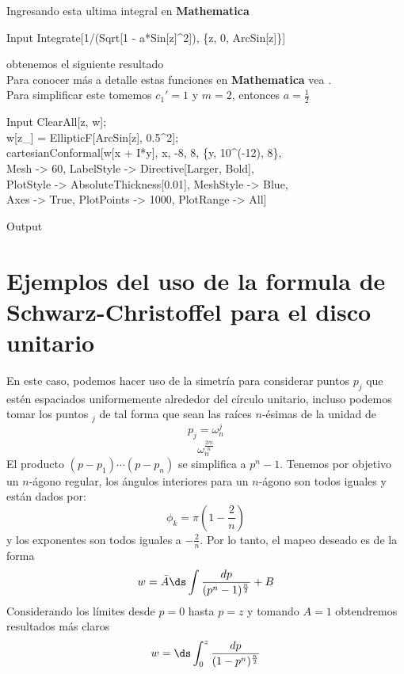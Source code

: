 Ingresando esta ultima integral en \textbf{Mathematica}
\begin{mmaCell}{Input}
  Integrate[1/(Sqrt[1 - a*Sin[z]^2]), \{z, 0, ArcSin[z]\}]
\end{mmaCell}
obtenemos el siguiente resultado\\
Para conocer más a detalle estas funciones en \textbf{Mathematica} vea \cite{Elliptic}.\\
Para simplificar este tomemos $c_1'=1$ y $m=2$, entonces $a=\frac{1}{2}$
\begin{mmaCell}{Input}
	 ClearAll[z, w];\\w[z_] = EllipticF[ArcSin[z], 0.5^2];\\cartesianConformal[w[x + I*y], {x, -8, 8}, \{y, 10^(-12), 8\},\\Mesh -> 60, LabelStyle -> Directive[Larger, Bold],\\PlotStyle -> AbsoluteThickness[0.01], MeshStyle -> Blue,\\Axes -> True, PlotPoints -> 1000, PlotRange -> All]
\end{mmaCell}
\begin{mmaCell}[moregraphics={moreig={scale=0.8}}]{Output}
\end{mmaCell}
\section{Ejemplos del uso de la formula de Schwarz-Christoffel para el disco unitario}
En este caso, podemos hacer uso de la simetría para considerar puntos $p_j$ que estén espaciados uniformemente alrededor del círculo unitario, incluso podemos tomar los puntos $_j$ de tal forma que sean las raíces $n$-ésimas de la unidad de
$$p_j=\omega_n^j$$
$$\omega_n^{\frac{2\pi i}{n}}$$
El producto $(p-p_1)\cdots (p-p_n)$ se simplifica a $p^n-1$. Tenemos por objetivo un $n$-ágono regular, los ángulos interiores para un $n$-ágono son todos iguales y están dados por:
$$\phi_k=\pi\left(1-\dfrac{2}{n}\right)$$
y los exponentes son todos iguales a $-\frac{2}{n}$. Por lo tanto, el mapeo deseado es de la forma 
\begin{equation}
	w=\bar{A}\ds\int \dfrac{dp}{(p^n-1)^{\frac{n}{2}}}+B
\end{equation} 
Considerando los límites desde $p=0$ hasta $p=z$ y tomando $A=1$ obtendremos resultados más claros
\begin{equation}\label{SCn}
	w=\ds\int_{0}^{z}\dfrac{dp}{(1-p^n)^{\frac{n}{2}}}
\end{equation}

